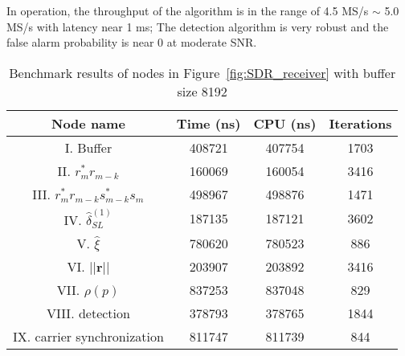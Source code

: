 In operation, the throughput of the algorithm is in the range of 4.5 MS/s $\sim$ 5.0 MS/s with latency near 1 ms;
The detection algorithm is very robust and the false alarm probability is near 0 at moderate SNR.

\begin{table}[t]
    \caption{Benchmark results of nodes in Figure~\ref{fig:SDR_receiver} with buffer size 8192}  %
    \centering %
    \begin{tabular}{c c c c} %
    \hline\hline %
    Node name & Time (ns) & CPU (ns) & Iterations \\ [0.5ex] %
    \hline %
    I. Buffer  & 408721 & 407754 & 1703 \\ %
    II. $r_m^*r_{m-k}$  & 160069 & 160054 & 3416 \\
    III. $r_m^*r_{m-k}s_{m-k}^*s_m$ & 498967 & 498876 & 1471 \\
    IV. $\hat{\delta}_{SL}^{(1)}$ & 187135 & 187121 & 3602 \\
    V. $\hat{\xi}$ & 780620 & 780523 & 886 \\
    VI. $||\bm{r}||$ & 203907 & 203892 & 3416 \\ %
    VII. $\rho(p)$ & 837253 & 837048 & 829 \\
    VIII. detection & 378793 & 378765 & 1844 \\
    IX. carrier synchronization & 811747 & 811739 & 844  \\ [1ex]
    \hline
    \end{tabular}
    \label{table:BM_function_nodes} %
  \end{table}

